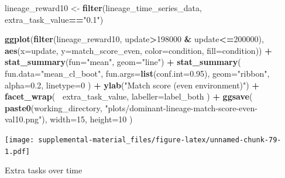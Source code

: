 \documentclass[]{book}
\newenvironment{Shaded}{\begin{snugshade}}{\end{snugshade}}
\newcommand{\DataTypeTok}[1]{\textcolor[rgb]{0.13,0.29,0.53}{#1}}
\newcommand{\DecValTok}[1]{\textcolor[rgb]{0.00,0.00,0.81}{#1}}
\newcommand{\FloatTok}[1]{\textcolor[rgb]{0.00,0.00,0.81}{#1}}
\newcommand{\KeywordTok}[1]{\textcolor[rgb]{0.13,0.29,0.53}{\textbf{#1}}}
\newcommand{\NormalTok}[1]{#1}
\newcommand{\OperatorTok}[1]{\textcolor[rgb]{0.81,0.36,0.00}{\textbf{#1}}}
\newcommand{\StringTok}[1]{\textcolor[rgb]{0.31,0.60,0.02}{#1}}
\begin{document}
\begin{Shaded}
\begin{Highlighting}[]
\NormalTok{lineage_reward10 <-}\StringTok{ }\KeywordTok{filter}\NormalTok{(lineage_time_series_data, extra_task_value}\OperatorTok{==}\StringTok{"0.1"}\NormalTok{)}

\KeywordTok{ggplot}\NormalTok{(}\KeywordTok{filter}\NormalTok{(lineage_reward10, update}\OperatorTok{>}\DecValTok{198000} \OperatorTok{&}\StringTok{ }\NormalTok{update}\OperatorTok{<=}\DecValTok{200000}\NormalTok{), }\KeywordTok{aes}\NormalTok{(}\DataTypeTok{x=}\NormalTok{update, }\DataTypeTok{y=}\NormalTok{match_score_even, }\DataTypeTok{color=}\NormalTok{condition, }\DataTypeTok{fill=}\NormalTok{condition)) }\OperatorTok{+}
\StringTok{  }\KeywordTok{stat_summary}\NormalTok{(}\DataTypeTok{fun=}\StringTok{"mean"}\NormalTok{, }\DataTypeTok{geom=}\StringTok{"line"}\NormalTok{) }\OperatorTok{+}
\StringTok{  }\KeywordTok{stat_summary}\NormalTok{(}
    \DataTypeTok{fun.data=}\StringTok{"mean_cl_boot"}\NormalTok{,}
    \DataTypeTok{fun.args=}\KeywordTok{list}\NormalTok{(}\DataTypeTok{conf.int=}\FloatTok{0.95}\NormalTok{),}
    \DataTypeTok{geom=}\StringTok{"ribbon"}\NormalTok{,}
    \DataTypeTok{alpha=}\FloatTok{0.2}\NormalTok{,}
    \DataTypeTok{linetype=}\DecValTok{0}
\NormalTok{  ) }\OperatorTok{+}
\StringTok{  }\KeywordTok{ylab}\NormalTok{(}\StringTok{"Match score (even environment)"}\NormalTok{) }\OperatorTok{+}
\StringTok{  }\KeywordTok{facet_wrap}\NormalTok{(}
    \OperatorTok{~}\NormalTok{extra_task_value,}
    \DataTypeTok{labeller=}\NormalTok{label_both}
\NormalTok{  ) }\OperatorTok{+}
\StringTok{  }\KeywordTok{ggsave}\NormalTok{(}
    \KeywordTok{paste0}\NormalTok{(working_directory, }\StringTok{"plots/dominant-lineage-match-score-even-val10.png"}\NormalTok{),}
    \DataTypeTok{width=}\DecValTok{15}\NormalTok{,}
    \DataTypeTok{height=}\DecValTok{10}
\NormalTok{  )}
\end{Highlighting}
\end{Shaded}

\texttt{[image: supplemental-material\_files/figure-latex/unnamed-chunk-79-1.pdf]}

Extra tasks over time
\end{document}
